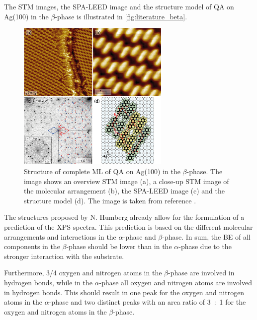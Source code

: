 The \ac{STM} images, the \ac{SPA-LEED} image and the structure model of \ac{QA} on Ag(100) in the $\beta$-phase is illustrated in \autoref{fig:literature_beta}.
\begin{figure}[htb]
	\centering
	\includegraphics[width=0.65\textwidth]{images/literature_beta.png}
	\caption{Structure of complete \ac{ML} of \ac{QA} on Ag(100) in the $\beta$-phase. The image shows an overview \ac{STM} image (a), a close-up \ac{STM} image of the molecular arrangement (b), the \ac{SPA-LEED} image (c) and the structure model (d). The image is taken from reference \cite{Humberg2024}.}
	\label{fig:literature_beta}
\end{figure}

The structures proposed by N. Humberg\autocite{Humberg2020,Humberg2024} already allow for the formulation of a prediction of the XPS spectra. This prediction is based on the different molecular arrangements and interactions in the $\alpha$-phase and $\beta$-phase. In sum, the \ac{BE} of all components in the $\beta$-phase should be lower than in the $\alpha$-phase due to the stronger interaction with the substrate.

Furthermore, 3/4 oxygen and nitrogen atoms in the $\beta$-phase are involved in hydrogen bonds, while in the $\alpha$-phase all oxygen and nitrogen atoms are involved in hydrogen bonds. This should result in one peak for the oxygen and nitrogen atoms in the $\alpha$-phase and two distinct peaks with an area ratio of 3~:~1 for the oxygen and nitrogen atoms in the $\beta$-phase.

\cleardoublepage